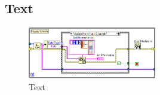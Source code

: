 	\subsection{Text}
	\begin{figure}[h!]
	\centering
		\includegraphics[width=0.5\textwidth]{Pics/front-kanale.png}
	\caption{Text}
	\label{fig:a11}
	\end{figure}
	
